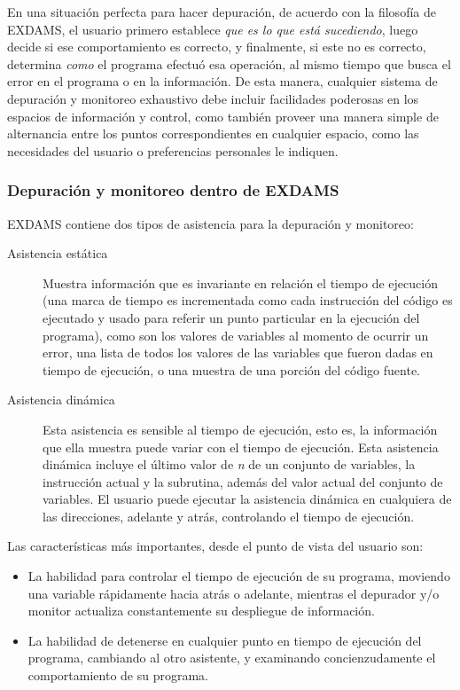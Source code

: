 \documentclass[12pt,legalpaper]{report}
\begin{document}
En una situación perfecta para hacer depuración, de acuerdo con la filosofía de EXDAMS, el usuario primero establece \textit{que es lo que está sucediendo}, luego decide si ese comportamiento es correcto, y finalmente, si este no es correcto, determina \textit{como} el programa efectuó esa operación, al mismo tiempo que busca el error en el programa o en la información.  De esta manera, cualquier sistema de depuración y monitoreo exhaustivo debe incluir facilidades poderosas en los espacios de información y control, como también proveer una manera simple de alternancia entre los puntos correspondientes en cualquier espacio, como las necesidades del usuario o preferencias personales le indiquen.

			\subsubsection[Depuración y monitoreo]{Depuración y monitoreo dentro de EXDAMS}

EXDAMS contiene dos tipos de asistencia para la depuración y monitoreo:

\begin{description}
	\item[Asistencia estática] Muestra información que es invariante en relación el tiempo de ejecución (una marca de tiempo es incrementada como cada instrucción del código es ejecutado y usado para referir un punto particular en la ejecución del programa), como son los valores de variables al momento de ocurrir un error, una lista de todos los valores de las variables que fueron dadas en tiempo de ejecución, o una muestra de una porción del código fuente.

	\item[Asistencia dinámica] Esta asistencia es sensible al tiempo de ejecución, esto es, la información que ella muestra puede variar con el tiempo de ejecución.  Esta asistencia dinámica incluye el último valor de \textit{n} de un conjunto de variables, la instrucción actual y la subrutina, además del valor actual del conjunto de variables.  El usuario puede ejecutar la asistencia dinámica en cualquiera de las direcciones, adelante y atrás, controlando el tiempo de ejecución.

\end{description}

Las características más importantes, desde el punto de vista del usuario son:

\begin{itemize}
	\item La habilidad para controlar el tiempo de ejecución de su programa, moviendo una variable rápidamente hacia atrás o adelante, mientras el depurador y/o monitor actualiza constantemente su despliegue de información.

	\item La habilidad de detenerse en cualquier punto en tiempo de ejecución del programa, cambiando al otro asistente, y examinando concienzudamente el comportamiento de su programa.

\end{itemize}
\end{document}
